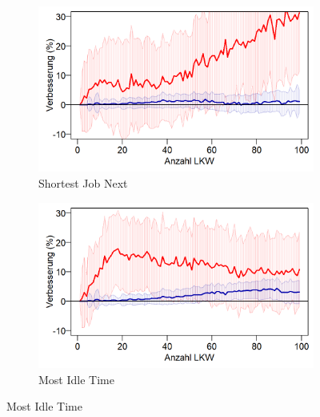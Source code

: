 
\begin{figure}[H]
\centering
\begin{subfigure}{.495\textwidth}
  \centering
  \includegraphics[width=\linewidth]{images/graphs/rsSlotsizeSjn_Streuung.png}
  \caption{Shortest Job Next}
  \label{fig:eofs1}
\end{subfigure}
\begin{subfigure}{.495\textwidth}
  \centering
  \includegraphics[width=\linewidth]{images/graphs/rsSlotsizeMit_Streuung.png}
  \caption{Most Idle Time}
  \label{fig:eofs2}
\end{subfigure}


\end{figure}
